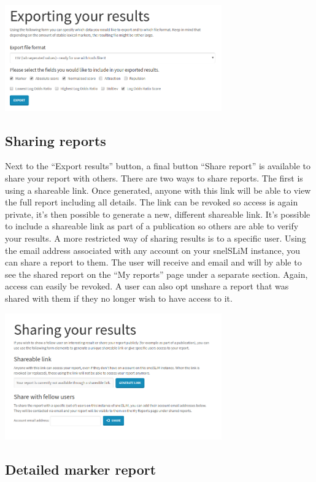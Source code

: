 \documentclass[11pt,a4paper]{article}
\begin{document}
\centerline{\includegraphics[width=0.7\textwidth]{images/exportresults.png}}

\subsection{Sharing reports}

Next to the ``Export results'' button, a final button ``Share report'' is available to share your report with others. There are two ways to share reports. The first is using a shareable link. Once generated, anyone with this link will be able to view the full report including all details. The link can be revoked so access is again private, it's then possible to generate a new, different shareable link. It's possible to include a shareable link as part of a publication so others are able to verify your results. A more restricted way of sharing results is to a specific user. Using the email address associated with any account on your snelSLiM instance, you can share a report to them. The user will receive and email and will by able to see the shared report on the ``My reports'' page under a separate section. Again, access can easily be revoked. A user can also opt unshare a report that was shared with them if they no longer wish to have access to it.

\centerline{\includegraphics[width=0.7\textwidth]{images/share.png}}

\subsection{Detailed marker report}
\end{document}
